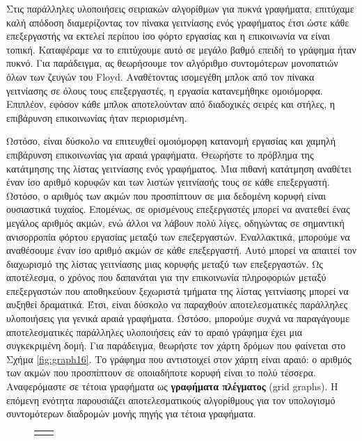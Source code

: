 \documentclass[12pt,a4paper]{article} %
\begin{document}
{{Στις παράλληλες υλοποιήσεις σειριακών αλγορίθμων για πυκνά γραφήματα,
επιτύχαμε καλή απόδοση διαμερίζοντας τον πίνακα γειτνίασης ενός
γραφήματος έτσι ώστε κάθε επεξεργαστής να εκτελεί περίπου ίσο φόρτο
εργασίας και η επικοινωνία να είναι τοπική. Καταφέραμε να το επιτύχουμε
αυτό σε μεγάλο βαθμό επειδή το γράφημα ήταν πυκνό. Για παράδειγμα,
ας θεωρήσουμε τον αλγόριθμο συντομότερων μονοπατιών όλων των ζευγών
του Floyd. Αναθέτοντας ισομεγέθη μπλοκ από τον πίνακα γειτνίασης
σε όλους τους επεξεργαστές, η εργασία κατανεμήθηκε ομοιόμορφα. Επιπλέον, εφόσον κάθε μπλοκ αποτελούνταν από διαδοχικές σειρές και στήλες, η επιβάρυνση επικοινωνίας ήταν περιορισμένη.

Ωστόσο, είναι δύσκολο να επιτευχθεί ομοιόμορφη κατανομή εργασίας και χαμηλή επιβάρυνση επικοινωνίας για αραιά γραφήματα. Θεωρήστε το πρόβλημα της κατάτμησης της λίστας γειτνίασης ενός γραφήματος. Μια πιθανή κατάτμηση αναθέτει έναν ίσο αριθμό κορυφών και των λιστών γειτνίασής τους σε κάθε επεξεργαστή. Ωστόσο, ο αριθμός των ακμών που προσπίπτουν σε μια δεδομένη κορυφή είναι ουσιαστικά τυχαίος. Επομένως, σε ορισμένους επεξεργαστές μπορεί να ανατεθεί ένας μεγάλος αριθμός ακμών, ενώ άλλοι να λάβουν πολύ λίγες, οδηγώντας σε σημαντική ανισορροπία φόρτου εργασίας μεταξύ των επεξεργαστών. 
Εναλλακτικά, μπορούμε να αναθέσουμε έναν ίσο αριθμό ακμών σε κάθε επεξεργαστή. Αυτό μπορεί να απαιτεί τον διαχωρισμό της λίστας γειτνίασης μιας κορυφής μεταξύ των επεξεργαστών. Ως αποτέλεσμα, ο χρόνος που δαπανάται για την επικοινωνία πληροφοριών μεταξύ επεξεργαστών που αποθηκεύουν ξεχωριστά τμήματα της λίστας γειτνίασης μπορεί να αυξηθεί δραματικά. Έτσι, είναι δύσκολο να παραχθούν αποτελεσματικές παράλληλες υλοποιήσεις για γενικά αραιά γραφήματα.
Ωστόσο, μπορούμε συχνά να παραγάγουμε αποτελεσματικές παράλληλες υλοποιήσεις εάν το αραιό γράφημα έχει μια συγκεκριμένη δομή. Για παράδειγμα, θεωρήστε τον χάρτη δρόμων που φαίνεται στο Σχήμα \ref{fig:graph16}. Το γράφημα που αντιστοιχεί στον χάρτη είναι αραιό: ο αριθμός των ακμών που προσπίπτουν σε οποιαδήποτε κορυφή είναι το πολύ τέσσερα. Αναφερόμαστε σε τέτοια γραφήματα ως \textbf{γραφήματα πλέγματος} (grid graphs). Η επόμενη ενότητα παρουσιάζει αποτελεσματικούς αλγορίθμους για τον υπολογισμό συντομότερων διαδρομών μονής πηγής για τέτοια γραφήματα.
\vspace{0.3cm}
\begin{figure}[H]
\centering
\begin{tabular}{cc}
\begin{tikzpicture}[scale=0.8, line width=1.2pt, line join=round]


\end{tikzpicture}
\end{tabular}
\end{figure}}}
\end{document}
